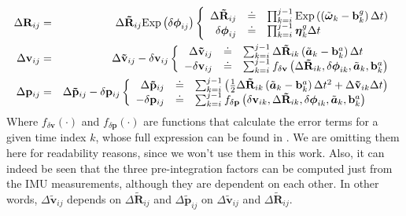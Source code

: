 \begin{eqnarray}
    \Delta\mathbf{R}_{ij} & = & \Delta\mathbf{\tilde{R}}_{ij}\textrm{Exp}\left(\delta\boldsymbol{\phi}_{ij}\right)
        \left\{
        \begin{array}{rll}
            \Delta\mathbf{\tilde{R}}_{ij} & \doteq  & \prod_{k=i}^{j-1}\textrm{Exp}\left(\left(\tilde{\boldsymbol{\omega}}_k -\mathbf{b}^g_k \right )\Delta t \right ) \\ 
            \delta\boldsymbol{\phi}_{ij} & \doteq  & \prod_{k=i}^{j-1}\boldsymbol\eta^g_k\Delta t
        \end{array}
        \right.
        \nonumber\\
    \Delta\mathbf{v}_{ij} & = & \Delta\mathbf{\tilde{v}}_{ij} - \delta\mathbf{v}_{ij}
        \left\{
        \begin{array}{rll}
            \Delta\mathbf{\tilde{v}}_{ij} & \doteq & \sum_{k=i}^{j-1}\Delta\mathbf{\tilde{R}}_{ik}\left(\tilde{\boldsymbol{a}}_k -\mathbf{b}^a_k\right )\Delta t\\
            -\delta\mathbf{v}_{ij} & \doteq & 
            \sum_{k=i}^{j-1}{f_{\delta\mathbf{v}}\left(\Delta\mathbf{\tilde{R}}_{ik}, \delta\boldsymbol{\phi}_{ik}, \tilde{\boldsymbol{a}}_k, \mathbf{b}^a_k\right)}
        \end{array}
        \right.
        \label{eq:pre_int_x}\\
    \Delta\mathbf{p}_{ij} & = & \Delta\mathbf{\tilde{p}}_{ij} - \delta\mathbf{p}_{ij}
    \left\{
        \begin{array}{rll}
            \Delta\mathbf{\tilde{p}}_{ij} & \doteq & \sum_{k=i}^{j-1}{\left(\tfrac{1}{2}\Delta\mathbf{\tilde{R}}_{ik}\left(\tilde{\boldsymbol{a}}_k -\mathbf{b}^a_k\right )\Delta t^2+\Delta\mathbf{\tilde{v}}_{ik}\Delta t\right)}\\
            -\delta\mathbf{p}_{ij} & \doteq & 
            \sum_{k=i}^{j-1}{f_{\delta\mathbf{p}}\left(\delta\mathbf{v}_{ik}, \Delta\mathbf{\tilde{R}}_{ik}, \delta\boldsymbol{\phi}_{ik}, \tilde{\boldsymbol{a}}_k, \mathbf{b}^a_k \right)}
        \end{array}
        \right.
        \nonumber
    \raisetag{20pt}
\end{eqnarray}
\endgroup
Where $f_{\delta\mathbf{v}}(\cdot)$ and $f_{\delta\mathbf{p}}(\cdot)$ are functions that calculate the error terms for a given time index $k$, whose full expression can be found in \cite{DBLP:journals/corr/ForsterCDS15}. 
We are omitting them here for readability reasons, since we won't use them in this work. 
Also, it can indeed be seen that the three pre-integration factors can be computed just from the IMU measurements, although they are dependent on each other. 
In other words, $\Delta\mathbf{\tilde{v}}_{ij}$ depends on $\Delta\mathbf{\tilde{R}}_{ij}$ and $\Delta\mathbf{\tilde{p}}_{ij}$ on $\Delta\mathbf{\tilde{v}}_{ij}$ and $\Delta\mathbf{\tilde{R}}_{ij}$.


